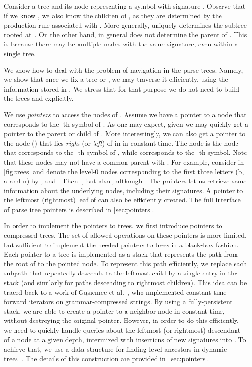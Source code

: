 \documentclass[a4paper]{article}
\theoremstyle{remark}
\begin{document}
Consider a tree  and its node  representing a symbol with signature .
Observe that if we know , we also know the children of , as they are determined by the production rule associated with .
More generally,  uniquely determines the subtree rooted at~.
On the other hand,  in general does not determine the parent of .
This is because there may be multiple nodes with the same signature, even within a single tree.

We show how to deal with the problem of navigation in the parse trees.
Namely, we show that once we fix a tree  or , we may traverse it efficiently, using the information stored in .
We stress that for that purpose we do not need to build the trees  and  explicitly.

We use \emph{pointers} to access the nodes of .
Assume we have a pointer  to a node  that corresponds to the -th symbol of .
As one may expect, given  we may quickly get a pointer to the parent or child of .
More interestingly, we can also get a pointer to the node  () that lies \emph{right} (or \emph{left}) of  in 
in constant time.
The node  is the node that corresponds to the -th symbol of ,
while  corresponds to the -th symbol.
Note that these nodes may not have a common parent with .
For example, consider  in \cref{fig:trees} and denote the level-0 nodes corresponding to the first three letters (b, a and n) by ,  and .
Then, , but also , although .
The pointers let us retrieve some information about the underlying nodes, including their signatures.
A pointer to the leftmost (rightmost) leaf of  can also be efficiently created.
The full interface of parse tree pointers is described in \cref{sec:pointers}.

In order to implement the pointers to  trees, we first introduce
pointers to compressed trees.
The set of allowed operations on these pointers is more limited, but sufficient
to implement the needed pointers to  trees
in a black-box fashion.
Each pointer to a tree  is implemented as a stack that represents the path from the root of  to the pointed node.
To represent this path efficiently, we replace each subpath that repeatedly descends to the leftmost child by a single entry in the stack (and similarly for paths descending to rightmost children).
This idea can be traced back to a work of Gąsieniec et al.~\cite{DBLP:conf/dcc/GasieniecKPS05}, who implemented constant-time
forward iterators on grammar-compressed strings.
By using a fully-persistent stack, we are able to create a pointer to a neighbor node in constant time, without destroying the original pointer.
However, in order to do this efficiently, we need to quickly handle queries about the leftmost (or rightmost) descendant of a node 
at a given depth, intermixed with insertions of new signatures into .
To achieve that, we use a data structure for finding level ancestors in dynamic trees~\cite{Alstrup:2000}.
The details of this construction are provided in~\cref{sec:pointers}.
\end{document}
